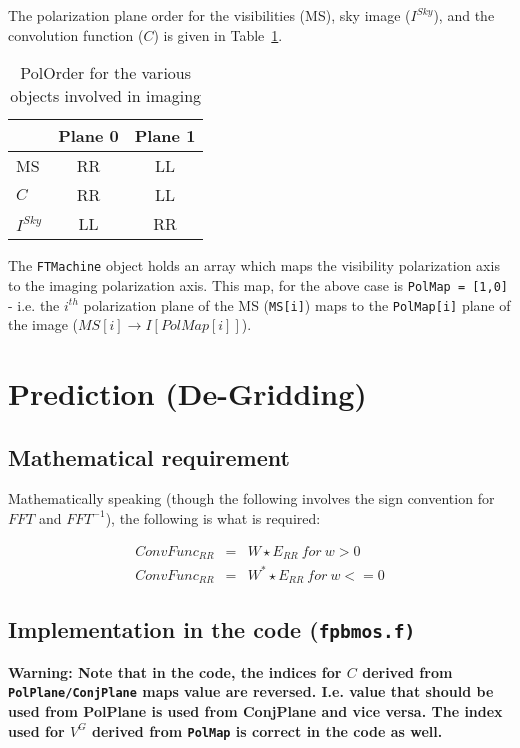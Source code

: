 \documentclass[11pt,epsf]{article}
\begin{document}
The polarization plane order for the visibilities (MS), sky image
($I^{Sky}$), and the convolution function ($C$) is given in Table~\ref{TAB:POLORDER}.
\begin{table}[!ht]
\caption{PolOrder for the various objects involved in imaging}
\label{TAB:POLORDER}
\begin{center}
\begin{tabular}{|l|c|c|}
\hline
         & Plane 0 & Plane 1\\
\hline
MS       &  RR     &  LL\\
$C$      &  RR     & LL\\
$I^{Sky}$&  LL     &  RR\\
\hline
\end{tabular}
\end{center}
\end{table}
The {\tt FTMachine} object holds an array which maps the visibility
polarization axis to the imaging polarization axis.  This map, for the
above case is {\tt PolMap = [1,0]} - i.e. the $i^{th}$ polarization
plane of the MS ({\tt MS[i]}) maps to the {\tt PolMap[i]} plane of the
image ($MS[i] \rightarrow I[PolMap[i]]$).

\section{Prediction (De-Gridding)}

\subsection{Mathematical requirement}

Mathematically speaking (though the following involves the sign
convention for $FFT$ and $FFT^{-1}$), the following is what is
required:

\begin{eqnarray}
ConvFunc_{RR} &=& W \star E_{RR}~for~w > 0 \nonumber \\
ConvFunc_{RR} &=& W^* \star E_{RR}~for~w <= 0 
\end{eqnarray}

\subsection{Implementation in the code (\tt fpbmos.f)}

{\bf Warning: Note that in the code, the indices for $C$ derived from
  {\tt PolPlane/ConjPlane} maps value are reversed.  I.e. value that
  should be used from PolPlane is used from ConjPlane and vice
  versa.   The index used for $V^G$ derived from {\tt PolMap} is
  correct in the code as well.}
\end{document}
